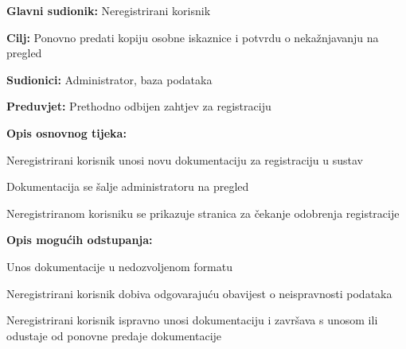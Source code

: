 						\begin{packed_item}
							
							\item \textbf{Glavni sudionik: }Neregistrirani korisnik
							\item  \textbf{Cilj:} Ponovno predati kopiju osobne iskaznice i potvrdu o nekažnjavanju na pregled
							\item  \textbf{Sudionici:} Administrator, baza podataka
							\item  \textbf{Preduvjet:} Prethodno odbijen zahtjev za registraciju
							\item  \textbf{Opis osnovnog tijeka:}
							
							\item[] \begin{packed_enum}
								
								\item Neregistrirani korisnik unosi novu dokumentaciju za registraciju u sustav 
								\item Dokumentacija se šalje administratoru na pregled 
								\item Neregistriranom korisniku se prikazuje stranica za čekanje odobrenja registracije
								
								
							\end{packed_enum}
							
							\item  \textbf{Opis mogućih odstupanja:}
							
							\item[] \begin{packed_item}
								
								\item[1.a] Unos dokumentacije u nedozvoljenom formatu 
								\item[] \begin{packed_enum}
									
									\item Neregistrirani korisnik dobiva odgovarajuću obavijest o neispravnosti podataka  
									\item Neregistrirani korisnik ispravno unosi dokumentaciju i završava s unosom ili odustaje od ponovne predaje dokumentacije  
									
								\end{packed_enum}
								
								
							\end{packed_item}
						\end{packed_item}
